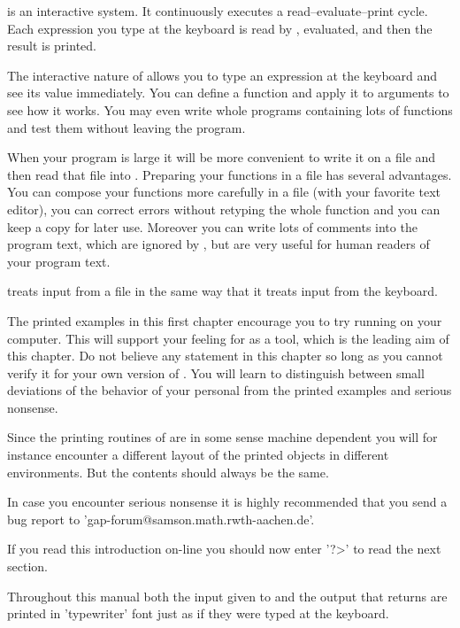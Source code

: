 {\GAP}   is  an  interactive  system.    It   continuously   executes   a
read--evaluate--print cycle.  Each expression you type at the keyboard is
read by {\GAP}, evaluated, and then the result is printed.

The interactive nature of {\GAP} allows you to type  an expression at the
keyboard and see its value immediately.  You can  define a  function  and
apply it to arguments  to  see how  it  works.  You may  even write whole
programs containing lots  of functions and test them without leaving  the
program.

When  your program  is large it will be  more convenient to write it on a
file and then read that file into {\GAP}.  Preparing  your functions in a
file  has  several  advantages.   You  can  compose  your functions  more
carefully in a file (with  your  favorite text  editor),  you can correct
errors without retyping the whole  function and you  can keep a copy  for
later  use.   Moreover you  can write lots  of comments into the  program
text, which are ignored  by {\GAP}, but are very useful for human readers
of your program text.

{\GAP} treats input from a file in the same way that it treats input from
the keyboard.

The printed examples in this first chapter  encourage  you to try running
{\GAP} on your computer.  This will  support your feeling for {\GAP} as a
tool, which is  the  leading  aim  of this chapter.   Do  not believe any
statement in this  chapter so  long as you cannot verify it  for your own
version  of  {\GAP}.   You  will  learn   to  distinguish  between  small
deviations  of the behavior  of your  personal  {\GAP} from  the  printed
examples and serious nonsense.

Since the printing routines of {\GAP} are in some sense machine dependent
you will for instance encounter a different layout of the printed objects
in different environments.  But the contents should always be the same.

In case  you encounter serious nonsense it is highly recommended that you
send a bug report to 'gap-forum@samson.math.rwth-aachen.de'.

If you read this  introduction on-line  you should now enter '?>' to read
the next section.


Throughout this manual both the input given to {\GAP} and the output that
{\GAP} returns are printed  in 'typewriter'  font  just  as if  they were
typed at the keyboard.

